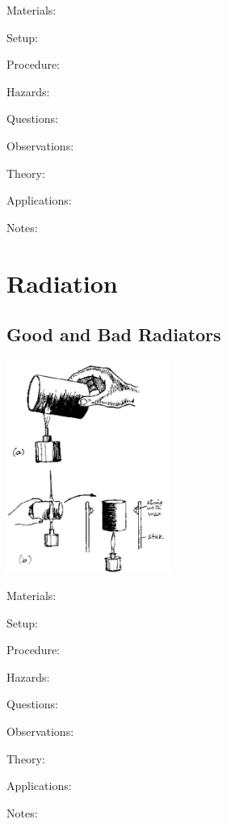 \begin{multicols}{2}
\begin{description*}
\item[Materials:]{}
\item[Setup:]{}
\item[Procedure:]{}
\item[Hazards:]{}
\item[Questions:]{}
\item[Observations:]{}
\item[Theory:]{}
\item[Applications:]{}
\item[Notes:]{}
\end{description*}


\section*{Radiation}


\subsection{Good and Bad Radiators}

\begin{center}
\includegraphics[width=0.4\textwidth]{./img/source/good-bad-radiators.png}
\end{center}

\begin{description*}
\item[Materials:]{}
\item[Setup:]{}
\item[Procedure:]{}
\item[Hazards:]{}
\item[Questions:]{}
\item[Observations:]{}
\item[Theory:]{}
\item[Applications:]{}
\item[Notes:]{}
\end{description*}


\end{multicols}
